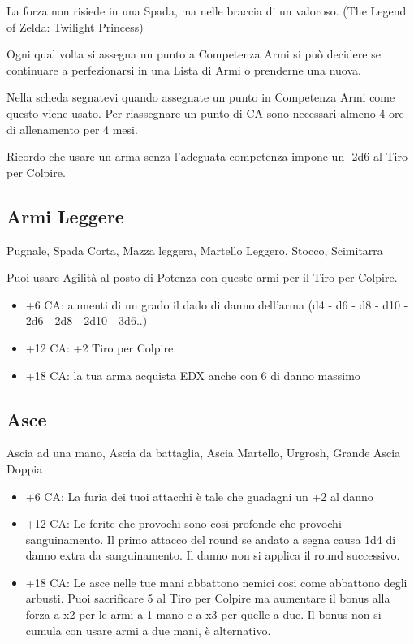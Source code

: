 \documentclass[a4paper,11pt,twoside,openany]{book}
\begin{document}
\label{lista-armi-per-tipologia-omogenea}
\begin{tcolorbox}[enhanced,arc=5pt,boxrule=0.3pt]{La forza non risiede in una Spada, ma nelle braccia di un valoroso. (The Legend of Zelda: Twilight Princess)}\end{tcolorbox}\medskip

Ogni qual volta si assegna un punto a Competenza Armi si può decidere se continuare a perfezionarsi in una Lista di Armi o prenderne una nuova.

Nella scheda segnatevi quando assegnate un punto in Competenza Armi come questo viene usato.
Per riassegnare un punto di CA sono necessari almeno 4 ore di allenamento per 4 mesi.

Ricordo che usare un arma senza l'adeguata competenza impone un -2d6 al Tiro per Colpire.

\subsection{Armi Leggere}Pugnale, Spada Corta, Mazza leggera, Martello Leggero, Stocco, Scimitarra

Puoi usare Agilità al posto di Potenza con queste armi per il Tiro
per Colpire.

\begin{itemize}
	\item +6 CA: aumenti di un grado il dado di danno dell'arma (d4 - d6 - d8 - d10 - 2d6 - 2d8 - 2d10 - 3d6..)

	\item +12 CA: +2 Tiro per Colpire

	\item +18 CA: la tua arma acquista EDX anche con 6 di danno massimo
\end{itemize}

\subsection{Asce} Ascia ad una mano, Ascia da battaglia, Ascia Martello, Urgrosh, Grande Ascia Doppia

\begin{itemize}

	\item +6 CA: La furia dei tuoi attacchi è tale che guadagni un +2 al danno

	\item +12 CA: Le ferite che provochi sono cosi profonde che provochi sanguinamento. Il primo attacco del round se andato a segna causa 1d4 di danno extra da sanguinamento. Il danno non si applica il round successivo.

	\item +18 CA: Le asce nelle tue mani abbattono nemici cosi come abbattono degli arbusti. Puoi sacrificare 5 al Tiro per Colpire ma aumentare il bonus alla forza a x2 per le armi a 1 mano e a x3 per quelle a due. Il bonus non si cumula con usare armi a due mani, è alternativo.

\end{itemize}
\end{document}
